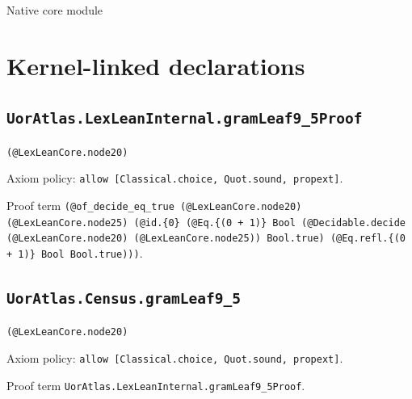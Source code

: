 \documentclass[11pt]{article}
\begin{document}
\begin{center}{\LARGE Native core module}\end{center}
\section*{Kernel-linked declarations}
\subsection*{\texttt{UorAtlas.LexLeanInternal.gramLeaf9\_5Proof}}
\noindent\texttt{(@LexLeanCore.node20)}\par
\noindent Axiom policy: \texttt{allow [Classical.choice, Quot.sound, propext]}.\par
\noindent Proof term \texttt{(@of\_decide\_eq\_true (@LexLeanCore.node20) (@LexLeanCore.node25) (@id.\{0\} (@Eq.\{(0 + 1)\} Bool (@Decidable.decide (@LexLeanCore.node20) (@LexLeanCore.node25)) Bool.true) (@Eq.refl.\{(0 + 1)\} Bool Bool.true)))}.\par
\subsection*{\texttt{UorAtlas.Census.gramLeaf9\_5}}
\noindent\texttt{(@LexLeanCore.node20)}\par
\noindent Axiom policy: \texttt{allow [Classical.choice, Quot.sound, propext]}.\par
\noindent Proof term \texttt{UorAtlas.LexLeanInternal.gramLeaf9\_5Proof}.\par
\end{document}
